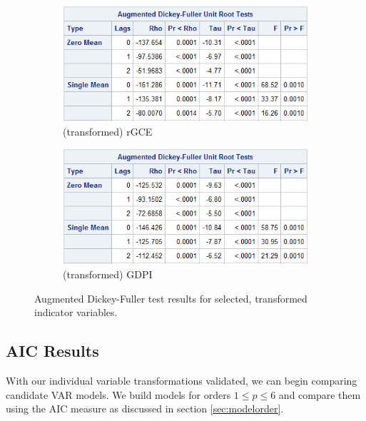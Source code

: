 \begin{figure}[h]
\begin{subfigure}{0.5\textwidth}
        \end{subfigure}
        \begin{subfigure}{0.5\textwidth}
            \includegraphics[width=\textwidth]{../img/rgce-fdlog-ADFtest2.png}
            \caption{(transformed) rGCE}
        \end{subfigure}
        \begin{subfigure}{0.5\textwidth}
            \includegraphics[width=\textwidth]{../img/gpdi-fdlog-ADFtest2.png}
            \caption{(transformed) GDPI}
        \end{subfigure}
        \caption{Augmented Dickey-Fuller test results for selected, transformed indicator variables.}
        \label{fig:adfresults}
    \end{figure}

\subsection{AIC Results}

    With our individual variable transformations validated, we can begin comparing
    candidate VAR models.  We build models for orders $1 \le p \le 6$ and compare them
    using the AIC measure as discussed in section \ref{sec:modelorder}.
    
